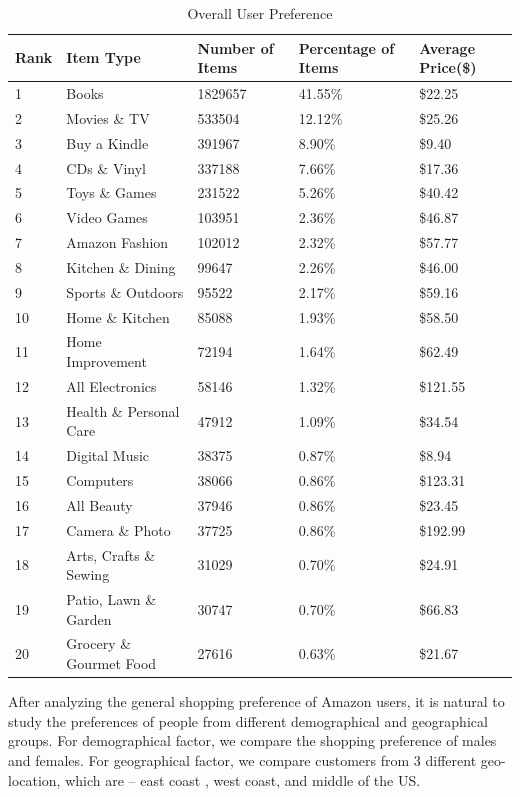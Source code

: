 \begin{table}[!ht]
\centering
\caption{Overall User Preference}
\label{tb:overall}
\begin{adjustbox}{max width=.5\textwidth}
\begin{tabular}{lllll}
Rank & Item Type          & Number of Items & Percentage of Items & Average Price(\$) \\ \hline
1 & Books & 1829657 & 41.55\% & \$22.25 \\
2 & Movies \& TV & 533504 & 12.12\% & \$25.26 \\
3 & Buy a Kindle & 391967 & 8.90\% & \$9.40 \\
4 & CDs \& Vinyl & 337188 & 7.66\% & \$17.36 \\
5 & Toys \& Games & 231522 & 5.26\% & \$40.42 \\
6 & Video Games & 103951 & 2.36\% & \$46.87 \\
7 & Amazon Fashion & 102012 & 2.32\% & \$57.77 \\
8 & Kitchen \& Dining & 99647 & 2.26\% & \$46.00 \\
9 & Sports \& Outdoors & 95522 & 2.17\% & \$59.16 \\
10 & Home \& Kitchen & 85088 & 1.93\% & \$58.50 \\
11 & Home Improvement & 72194 & 1.64\% & \$62.49 \\
12 & All Electronics & 58146 & 1.32\% & \$121.55 \\
13 & Health \& Personal Care & 47912 & 1.09\% & \$34.54 \\
14 & Digital Music & 38375 & 0.87\% & \$8.94 \\
15 & Computers & 38066 & 0.86\% & \$123.31 \\
16 & All Beauty & 37946 & 0.86\% & \$23.45 \\
17 & Camera \& Photo & 37725 & 0.86\% & \$192.99 \\
18 & Arts, Crafts \& Sewing & 31029 & 0.70\% & \$24.91 \\
19 & Patio, Lawn \& Garden & 30747 & 0.70\% & \$66.83 \\
20 & Grocery \& Gourmet Food & 27616 & 0.63\% & \$21.67 \\
\end{tabular}
\end{adjustbox}
\end{table}

After analyzing the general shopping preference of Amazon users, it is natural to study the preferences of people from different demographical and geographical groups. For demographical factor, we compare the shopping preference of males and females. For geographical factor, we compare customers from 3 different geo-location, which are -- east coast \cite{east}, west coast\cite{west}, and middle of the US. 

